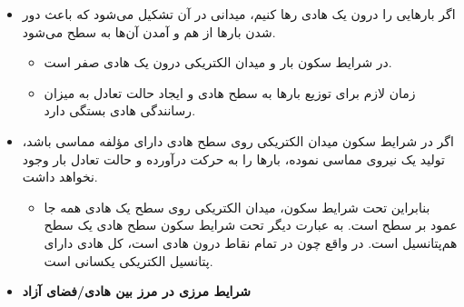 \ELhold


\begin{ELunit}

\begin{itemize}
\tightlist
\item
  اگر بارهایی را درون یک هادی رها کنیم، میدانی در آن تشکیل می‌شود که باعث دور شدن بارها از هم و آمدن آن‌ها به سطح می‌شود.

  \begin{itemize}
  \item
    در شرایط سکون بار و میدان الکتریکی درون یک هادی صفر است.
  \item
    زمان لازم برای توزیع بارها به سطح هادی و ایجاد حالت تعادل به میزان رسانندگی هادی بستگی دارد.
  \end{itemize}
\item
  اگر در شرایط سکون میدان الکتریکی روی سطح هادی دارای مؤلفه مماسی باشد، تولید یک نیروی مماسی نموده، بارها را به حرکت درآورده و حالت تعادل بار وجود نخواهد داشت.

  \begin{itemize}
  \tightlist
  \item
    بنابراین تحت شرایط سکون، میدان الکتریکی روی سطح یک هادی همه جا عمود بر سطح است. به عبارت دیگر تحت شرایط سکون سطح هادی یک سطح هم‌پتانسیل است. در واقع چون در تمام نقاط درون هادی  است، کل هادی دارای پتانسیل الکتریکی یکسانی است.
  \end{itemize}
\item
  \textbf{شرایط مرزی در مرز بین هادی/فضای آزاد}
\end{itemize}


\end{ELunit}

